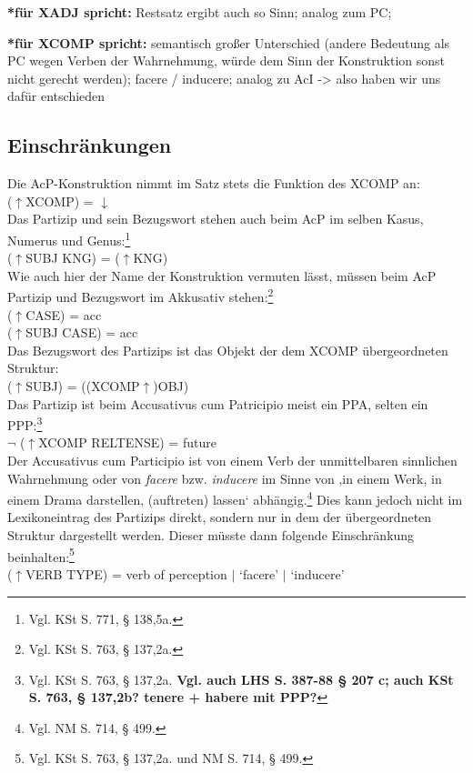 \documentclass[12pt,a4paper]{article}
\begin{document}
	\textbf{*für XADJ spricht:} Restsatz ergibt auch so Sinn; analog zum PC;
	
	\textbf{*für XCOMP spricht:} semantisch großer Unterschied (andere Bedeutung als PC wegen Verben der Wahrnehmung, würde dem Sinn der Konstruktion sonst nicht gerecht werden); facere / inducere; analog zu AcI -> also haben wir uns dafür entschieden \\

\subsection{Einschränkungen}
Die AcP-Konstruktion nimmt im Satz stets die Funktion des XCOMP an: \\
($\uparrow$XCOMP) = $\downarrow$ \\
Das Partizip und sein Bezugswort stehen auch beim AcP im selben Kasus, Numerus und Genus:\footnote{Vgl. KSt S. 771, § 138,5a.}\\
($\uparrow$SUBJ KNG) = ($\uparrow$KNG)\\
Wie auch hier der Name der Konstruktion vermuten lässt, müssen beim AcP Partizip und Bezugswort im Akkusativ stehen:\footnote{Vgl. KSt S. 763, § 137,2a.} \\
($\uparrow$CASE) = acc \\
($\uparrow$SUBJ CASE) = acc \\
Das Bezugswort des Partizips ist das Objekt der dem XCOMP übergeordneten Struktur: \\
	($\uparrow$SUBJ) = ((XCOMP$\uparrow$)OBJ) \\
Das Partizip ist beim Accusativus cum Patricipio meist ein PPA, selten ein PPP:\footnote{Vgl. KSt S. 763, § 137,2a. \textbf{Vgl. auch LHS S. 387-88 § 207 c; auch KSt S. 763, § 137,2b? tenere + habere mit PPP?}} \\
$\neg$ ($\uparrow$XCOMP RELTENSE) = future \\
Der Accusativus cum Participio ist von einem Verb der unmittelbaren sinnlichen Wahrnehmung oder von \textit{facere} bzw. \textit{inducere} im Sinne von ‚in einem Werk, in einem Drama darstellen, (auftreten) lassen‘ abhängig.\footnote{Vgl. NM S. 714, § 499.} Dies kann jedoch nicht im Lexikoneintrag des Partizips direkt, sondern nur in dem der übergeordneten Struktur dargestellt werden. Dieser müsste dann folgende Einschränkung beinhalten:\footnote{Vgl. KSt S. 763, § 137,2a. und NM S. 714, § 499.} \\
($\uparrow$VERB TYPE) = verb of perception $\mid$ `facere' $\mid$ `inducere'
	
\end{document}
